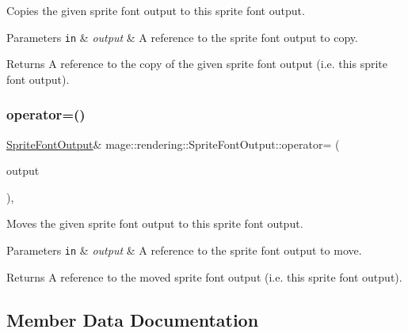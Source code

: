 Copies the given sprite font output to this sprite font output.


\begin{DoxyParams}[1]{Parameters}
\mbox{\tt in}  & {\em output} & A reference to the sprite font output to copy. \\
\hline
\end{DoxyParams}
\begin{DoxyReturn}{Returns}
A reference to the copy of the given sprite font output (i.\+e. this sprite font output). 
\end{DoxyReturn}
\hypertarget{structmage_1_1rendering_1_1_sprite_font_output_aff107541c1b9a0fb3052a6ed0dbae7dd}{}\label{structmage_1_1rendering_1_1_sprite_font_output_aff107541c1b9a0fb3052a6ed0dbae7dd} 
\subsubsection{\texorpdfstring{operator=()}{operator=()}\hspace{0.1cm}{\footnotesize\ttfamily [2/2]}}
{\footnotesize\ttfamily \hyperlink{structmage_1_1rendering_1_1_sprite_font_output}{Sprite\+Font\+Output}\& mage\+::rendering\+::\+Sprite\+Font\+Output\+::operator= (\begin{DoxyParamCaption}\item[{\hyperlink{structmage_1_1rendering_1_1_sprite_font_output}{Sprite\+Font\+Output} \&\&}]{output }\end{DoxyParamCaption})\hspace{0.3cm}{\ttfamily [default]}, {\ttfamily [noexcept]}}

Moves the given sprite font output to this sprite font output.


\begin{DoxyParams}[1]{Parameters}
\mbox{\tt in}  & {\em output} & A reference to the sprite font output to move. \\
\hline
\end{DoxyParams}
\begin{DoxyReturn}{Returns}
A reference to the moved sprite font output (i.\+e. this sprite font output). 
\end{DoxyReturn}


\subsection{Member Data Documentation}
\hypertarget{structmage_1_1rendering_1_1_sprite_font_output_af35542b71c315b2ed6059ab53413d34c}{}\label{structmage_1_1rendering_1_1_sprite_font_output_af35542b71c315b2ed6059ab53413d34c} 

